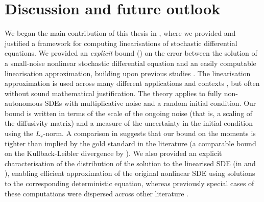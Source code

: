 \chapter{Discussion and future outlook}\label{ch:outlook}

We began the main contribution of this thesis in , where we provided and justified a framework for computing linearisations of stochastic differential equations.
We provided an \emph{explicit} bound () on the error between the solution of a small-noise nonlinear stochastic differential equation and an easily computable linearisation approximation, building upon previous studies \citep{Blagoveshchenskii_1962_DiffusionProcessesDepending,FreidlinWentzell_1998_RandomPerturbationsDynamical,Sanz-AlonsoStuart_2017_GaussianApproximationsSmall}.
The linearisation approximation is used across many different applications and contexts \citep[e.g.]{Jazwinski_2014_StochasticProcessesFiltering, Sanz-AlonsoStuart_2017_GaussianApproximationsSmall,KaszasHaller_2020_UniversalUpperEstimate,ArchambeauEtAl_2007_GaussianProcessApproximations}, but often without sound mathematical justification.
The theory applies to fully non-autonomous SDEs with multiplicative noise and a random initial condition.
Our bound is written in terms of the scale of the ongoing noise (that is, a scaling of the diffusivity matrix) and a measure of the uncertainty in the initial condition using the \(L_r\)-norm.
A comparison in  suggests that our bound on the moments is tighter than implied by the gold standard in the literature (a comparable bound on the Kullback-Leibler divergence by \citet{Sanz-AlonsoStuart_2017_GaussianApproximationsSmall}).
We also provided an explicit characterisation of the distribution of the solution to the linearised SDE (in  and ), enabling efficient approximation of the original nonlinear SDE using solutions to the corresponding deterministic equation, whereas previously special cases of these computations were dispersed across other literature \citep[e.g.]{Jazwinski_2014_StochasticProcessesFiltering,Sanz-AlonsoStuart_2017_GaussianApproximationsSmall,SarkkaSolin_2019_AppliedStochasticDifferential}.
